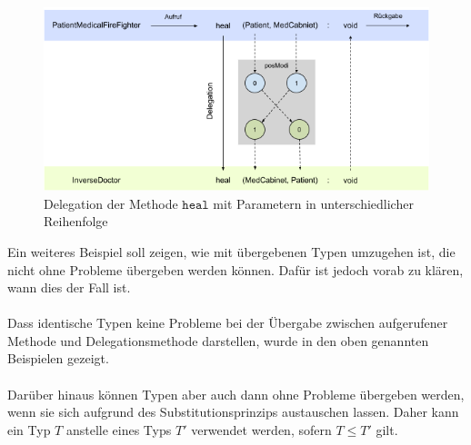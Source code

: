 \documentclass[a4paper,12pt]{article}
\begin{document}
\begin{figure}[H]
\includegraphics[width=\linewidth]{MDEL_healInverse}
\caption{Delegation der Methode $\texttt{heal}$ mit Parametern in unterschiedlicher Reihenfolge}
\label{fig:DEL_healInverse}
\end{figure}
\noindent
Ein weiteres Beispiel soll zeigen, wie mit übergebenen Typen umzugehen ist, die nicht ohne Probleme übergeben werden können. Dafür ist jedoch vorab zu klären, wann dies der Fall ist.\\\\
Dass identische Typen keine Probleme bei der Übergabe zwischen aufgerufener Methode und Delegationsmethode darstellen, wurde in den oben genannten Beispielen gezeigt.\\\\
Darüber hinaus können Typen aber auch dann ohne Probleme übergeben werden, wenn sie sich aufgrund des Substitutionsprinzips austauschen lassen. Daher kann ein Typ $T$ anstelle eines Typs $T'$ verwendet werden, sofern $T \leq T'$ gilt.
\end{document}

